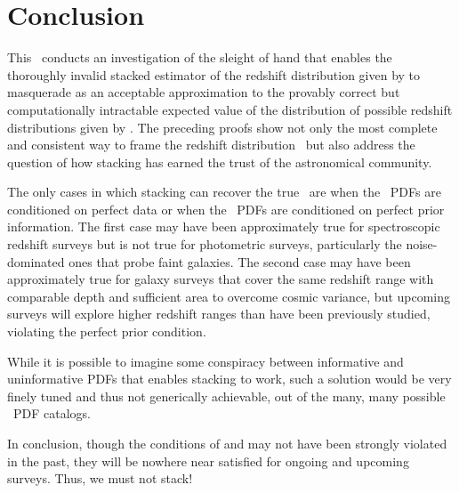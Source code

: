 \section{Conclusion}


This \ conducts an investigation of the sleight of hand that enables the thoroughly invalid stacked estimator of the redshift distribution given by  to masquerade as an acceptable approximation to the provably correct but computationally intractable expected value of the distribution of possible redshift distributions given by .
The preceding proofs show not only the most complete and consistent way to frame the redshift distribution \Nz\ but also address the question of how stacking has earned the trust of the astronomical community.

The only cases in which stacking can recover the true \Nz\ are when the \pz\ PDFs are conditioned on perfect data or when the \pz\ PDFs are conditioned on perfect prior information.
The first case may have been approximately true for spectroscopic redshift surveys but is not true for photometric surveys, particularly the noise-dominated ones that probe faint galaxies.
The second case may have been approximately true for galaxy surveys that cover the same redshift range with comparable depth and sufficient area to overcome cosmic variance, but upcoming surveys will explore higher redshift ranges than have been previously studied, violating the perfect prior condition.

While it is possible to imagine some conspiracy between informative and uninformative \pz PDFs that enables stacking to work, such a solution would be very finely tuned and thus not generically achievable, out of the many, many possible \pz\ PDF catalogs.

In conclusion, though the conditions of  and  may not have been strongly violated in the past, they will be nowhere near satisfied for ongoing and upcoming surveys.
Thus, we must not stack!

